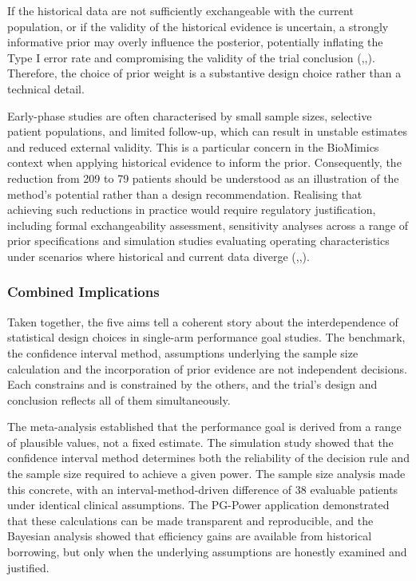 \documentclass{article}
\begin{document}
If the historical data are not sufficiently exchangeable with the
current population, or if the validity of the historical evidence is
uncertain, a strongly informative prior may overly influence the
posterior, potentially inflating the Type I error rate and compromising
the validity of the trial conclusion
(,,).
Therefore, the choice of prior weight is a substantive design choice
rather than a technical detail.

Early-phase studies are often characterised by small sample sizes,
selective patient populations, and limited follow-up, which can result
in unstable estimates and reduced external validity. This is a
particular concern in the BioMimics context when applying historical
evidence to inform the prior. Consequently, the reduction from 209 to 79
patients should be understood as an illustration of the method's
potential rather than a design recommendation. Realising that achieving
such reductions in practice would require regulatory justification,
including formal exchangeability assessment, sensitivity analyses across
a range of prior specifications and simulation studies evaluating
operating characteristics under scenarios where historical and current
data diverge
(,,).

\subsubsection{Combined Implications}\label{combined-implications}

Taken together, the five aims tell a coherent story about the
interdependence of statistical design choices in single-arm performance
goal studies. The benchmark, the confidence interval method, assumptions
underlying the sample size calculation and the incorporation of prior
evidence are not independent decisions. Each constrains and is
constrained by the others, and the trial's design and conclusion
reflects all of them simultaneously.

The meta-analysis established that the performance goal is derived from
a range of plausible values, not a fixed estimate. The simulation study
showed that the confidence interval method determines both the
reliability of the decision rule and the sample size required to achieve
a given power. The sample size analysis made this concrete, with an
interval-method-driven difference of 38 evaluable patients under
identical clinical assumptions. The PG-Power application demonstrated
that these calculations can be made transparent and reproducible, and
the Bayesian analysis showed that efficiency gains are available from
historical borrowing, but only when the underlying assumptions are
honestly examined and justified.
\end{document}
